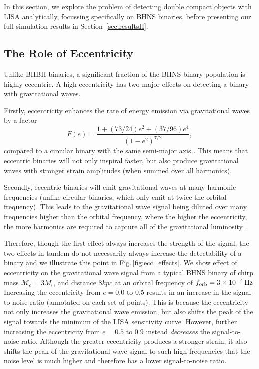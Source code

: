In this section, we explore the problem of detecting double compact objects with LISA analytically, focussing specifically on BHNS binaries, before presenting our full simulation results in Section~\ref{sec:resultsII}.

\subsection{The Role of Eccentricity}\label{sec:eccentricity_role}

Unlike BHBH binaries, a significant fraction of the BHNS binary population is highly eccentric. A high eccentricity has two major effects on detecting a binary with gravitational waves.

Firstly, eccentricity enhances the rate of energy emission via gravitational waves by a factor
\begin{equation}
    F(e) = \frac{1 + (73 / 24) e^2 + (37 / 96) e^4}{(1 - e^2)^{7/2}},
\end{equation}
compared to a circular binary with the same semi-major axis \citep[][Eq.\,17]{Peters+1963}. This means that eccentric binaries will not only inspiral faster, but also produce gravitational waves with stronger strain amplitudes (when summed over all harmonics).

Secondly, eccentric binaries will emit gravitational waves at many harmonic frequencies (unlike circular binaries, which only emit at twice the orbital frequency). This leads to the gravitational wave signal being diluted over many frequencies higher than the orbital frequency, where the higher the eccentricity, the more harmonics are required to capture all of the gravitational luminosity \citep[see][Fig.\,3]{Peters+1963}.

Therefore, though the first effect always increases the strength of the signal, the two effects in tandem do not necessarily always increase the detectability of a binary and we illustrate this point in Fig.\,\ref{fig:ecc_effects}. We show effect of eccentricity on the gravitational wave signal from a typical BHNS binary of chirp mass $\mathcal{M}_c = 3 \unit{M_{\odot}}$ and distance $8 \unit{kpc}$ at an orbital frequency of $f_{\rm orb} = 3 \times 10^{-4} \unit{Hz}$. Increasing the eccentricity from $e = 0.0$ to $0.5$ results in an increase in the signal-to-noise ratio (annotated on each set of points). This is because the eccentricity not only increases the gravitational wave emission, but also shifts the peak of the signal towards the minimum of the LISA sensitivity curve. However, further increasing the eccentricity from $e = 0.5$ to $0.9$ instead \textit{decreases} the signal-to-noise ratio. Although the greater eccentricity produces a stronger strain, it also shifts the peak of the gravitational wave signal to such high frequencies that the noise level is much higher and therefore has a lower signal-to-noise ratio.

